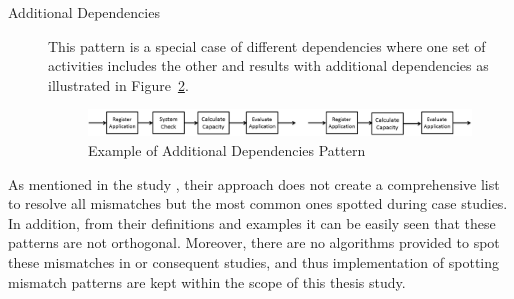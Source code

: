 \begin{description}
\begin{figure}
      \label{fig:different-dependency}
      \end{figure}
  \item[Additional Dependencies] This pattern is a special case of different dependencies where one set of activities includes the other and results with additional dependencies as illustrated in Figure~\ref{fig:additional-dependency}.
      \begin{figure}
      \centering
      \includegraphics[width=\textwidth]{3_background/mismatch-patterns-additional-dependency}
      \caption{Example of Additional Dependencies Pattern}
      \label{fig:additional-dependency}
      \end{figure}
\end{description}

As mentioned in the study \cite{dijkman2007mismatch}, their approach does not create a comprehensive list to resolve all mismatches but the most common ones spotted during case studies. In addition, from their definitions and examples it can be easily seen that these patterns are not orthogonal. Moreover, there are no algorithms provided to spot these mismatches in \cite{dijkman2007mismatch} or consequent studies, and thus implementation of spotting mismatch patterns are kept within the scope of this thesis study.